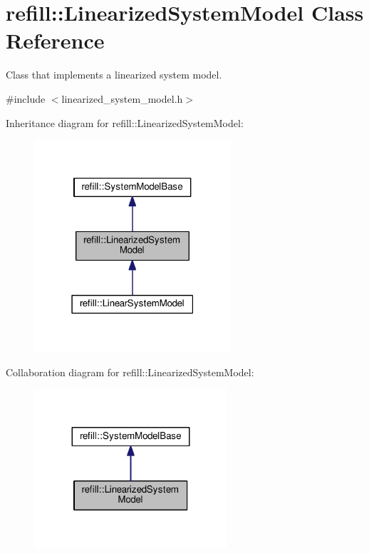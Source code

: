 \hypertarget{classrefill_1_1LinearizedSystemModel}{}\section{refill\+:\+:Linearized\+System\+Model Class Reference}
\label{classrefill_1_1LinearizedSystemModel}


Class that implements a linearized system model.  




{\ttfamily \#include $<$linearized\+\_\+system\+\_\+model.\+h$>$}



Inheritance diagram for refill\+:\+:Linearized\+System\+Model\+:\nopagebreak
\begin{figure}[H]
\begin{center}
\leavevmode
\includegraphics[width=207pt]{classrefill_1_1LinearizedSystemModel__inherit__graph}
\end{center}
\end{figure}


Collaboration diagram for refill\+:\+:Linearized\+System\+Model\+:\nopagebreak
\begin{figure}[H]
\begin{center}
\leavevmode
\includegraphics[width=203pt]{classrefill_1_1LinearizedSystemModel__coll__graph}
\end{center}
\end{figure}
